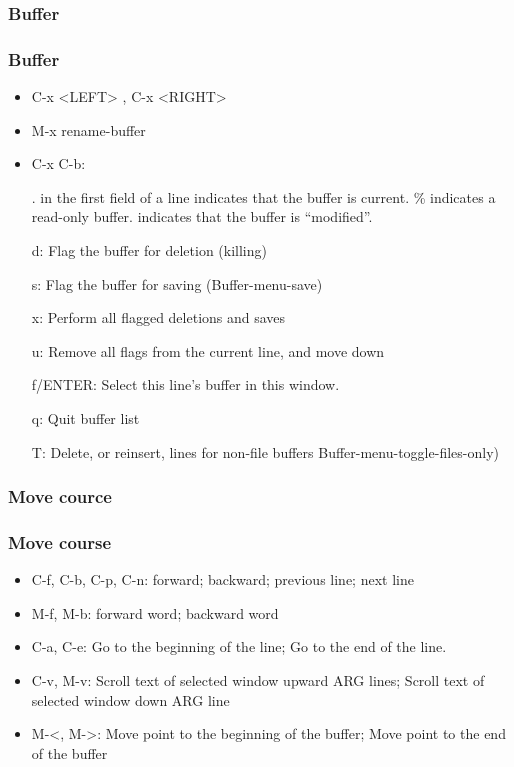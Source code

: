 \subsubsection{Buffer}
\begin{frame}
\frametitle{Buffer}
    \begin{itemize}
        \item C-x <LEFT> , C-x <RIGHT>
        \item M-x rename-buffer
        \item C-x C-b:

  . in the first field of a line indicates that the buffer is current. \% indicates a read-only buffer. \* indicates that the buffer is “modified”.

  d: Flag the buffer for deletion (killing)

  s: Flag the buffer for saving (Buffer-menu-save)

  x: Perform all flagged deletions and saves

  u: Remove all flags from the current line, and move down

  f/ENTER: Select this line's buffer in this window.

  q: Quit buffer list

  T: Delete, or reinsert, lines for non-file buffers Buffer-menu-toggle-files-only)
    \end{itemize}
\end{frame}
\subsubsection{Move cource}
\begin{frame}
\frametitle{Move course}
    \begin{itemize}
        \item C-f, C-b, C-p, C-n: forward; backward; previous line; next line
        \item M-f, M-b: forward word; backward word
        \item C-a, C-e: Go to the beginning of the line; Go to the end of the line.
        \item C-v, M-v: Scroll text of selected window upward ARG lines; Scroll text of selected window down ARG line
        \item M-<, M->: Move point to the beginning of the buffer; Move point to the end of the buffer
    \end{itemize}
\end{frame}
